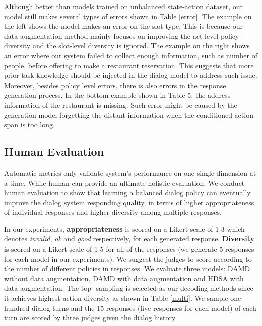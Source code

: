 \documentclass[letterpaper]{article} \usepackage{aaai20}  \usepackage{times}  \usepackage{helvet} \usepackage{courier}  \usepackage[hyphens]{url}  \usepackage{graphicx} \urlstyle{rm} \def\UrlFont{\rm}  \usepackage{graphicx}  \frenchspacing  \setlength{\pdfpagewidth}{8.5in}  \setlength{\pdfpageheight}{11in}  \usepackage{multirow}
\begin{document}
	Although better than models trained on unbalanced state-action dataset, our model still makes several types of errors shown in Table \ref{error}. The example on the left shows the model makes an error on the slot type. This is because our data augmentation method mainly focuses on improving the act-level policy diversity and the slot-level diversity is ignored. The example on the right shows an error where our system failed to collect enough information, such as number of people, before offering to make a restaurant reservation. This suggests that more prior task knowledge should be injected in the dialog model to address such issue. Moreover, besides policy level errors, there is also errors in the response generation process. In the bottom example shown in Table 5, the address information of the restaurant is missing. Such error might be caused by the generation model forgetting the distant information when the conditioned action span is too long.
	
	
	
	
	
	
	\subsection{Human Evaluation}
	
	Automatic metrics only validate system’s performance on one single dimension at a time. While human can provide an ultimate holistic evaluation. We conduct human evaluation to show that learning a balanced dialog policy can eventually improve the dialog system responding quality, in terms of higher appropriateness of individual responses and higher diversity among multiple responses. 
	
	In our experiments, \textbf{appropriateness} is scored on a Likert scale of 1-3 which denotes \textit{invalid}, \textit{ok} and \textit{good} respectively, for each generated response. \textbf{Diversity} is scored on a Likert scale of 1-5 for all of the responses (we generate 5 responses for each model in our experiments). We suggest the judges to score according to the number of different policies in responses. We evaluate three models: DAMD without data augmentation, DAMD with data augmentation and HDSA with data augmentation. The top- sampling is selected as our decoding methods since it achieves highest action diversity as shown in Table \ref{multi}. We sample one hundred dialog turns and the 15 responses (five responses for each model) of each turn are scored by three judges given the dialog history. 
	
\end{document}
